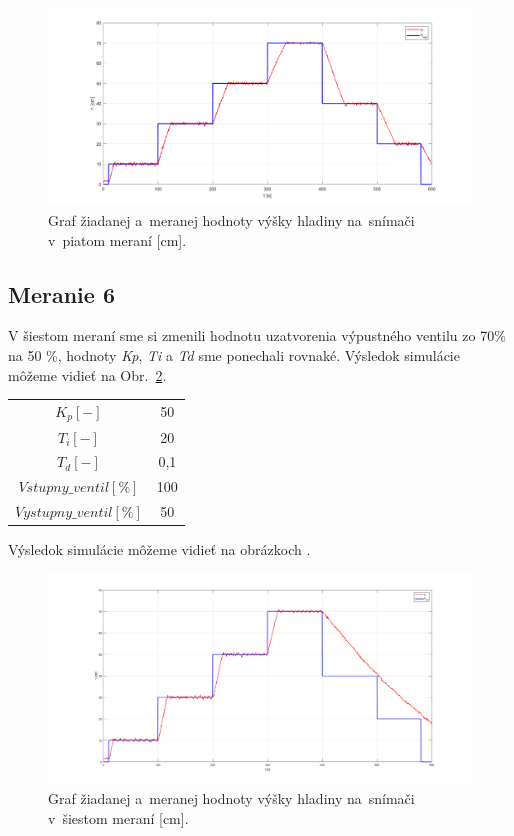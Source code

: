 \documentclass{article}
\begin{document}
\begin{figure}[!htbp]
	\begin{center}
		\includegraphics[width=\textwidth]{./include/meranie5.png}
	\end{center}
	\caption{Graf žiadanej a~meranej hodnoty výšky hladiny na~snímači v~piatom meraní [cm].}
	\label{fig:m5}
\end{figure}

\clearpage

\subsection{Meranie 6}
\label{sec:meranie6}

V šiestom meraní sme si zmenili hodnotu uzatvorenia výpustného ventilu zo 70\% na 50 \%, hodnoty
\textit{Kp}, \textit{Ti} a \textit{Td} sme ponechali rovnaké. Výsledok simulácie môžeme vidieť na Obr.~\ref{fig:m6}.

\begin{center}
\begin{tabular}{ |c|c| }
 \hline
 $K_p [-]$ & 50 \\
 $T_i [-]$ & 20 \\
 $T_d [-]$ & 0,1 \\
 \hline
 $Vstupny\_ventil[\%]$ & 100 \\
 $Vystupny\_ventil[\%]$ & 50 \\
 \hline
\end{tabular}
\end{center}

Výsledok simulácie môžeme vidieť na obrázkoch  .

\begin{figure}[!htbp]
	\begin{center}
		\includegraphics[width=\textwidth]{./include/meranie6.png}
	\end{center}
	\caption{Graf žiadanej a~meranej hodnoty výšky hladiny na~snímači v~šiestom meraní [cm].}
	\label{fig:m6}
\end{figure}
\end{document}
